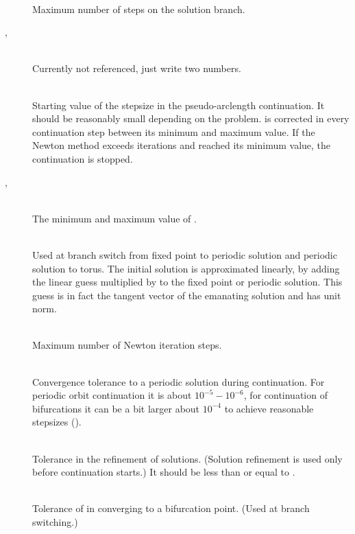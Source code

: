 \documentclass[10pt,a4paper]{ddedoc}
\begin{document}
\begin{description}
%
\item[] ~\\
Maximum number of steps on the solution branch.
%
\item[, ] ~\\
Currently not referenced, just write two numbers.
%
\item[] ~\\
Starting value of the stepsize in the pseudo-arclength continuation.
It should be reasonably small depending on the problem.  is corrected in every continuation step between its minimum and maximum value. If the Newton method exceeds  iterations and  reached its minimum value, the continuation is stopped.
%
\item[, ] ~\\
The minimum and maximum value of .
%
\item[] ~\\
Used at branch switch from fixed point to periodic solution and periodic solution to torus. The initial solution is approximated linearly, by adding the linear guess multiplied by  to the fixed point or periodic solution. This guess is in fact the tangent vector of the emanating solution and has unit norm.
%
\item[] ~\\
Maximum number of Newton iteration steps.
%
\item[] ~\\
Convergence tolerance to a periodic solution during continuation. For periodic orbit continuation it is about $10^{-5} - 10^{-6}$, for continuation of bifurcations it can be a bit larger about $10^{-4}$ to achieve reasonable stepsizes ().
%
\item[] ~\\
Tolerance in the refinement of solutions. (Solution refinement is used only before continuation starts.) It should be less than or equal to .
%
\item[] ~\\
Tolerance of  in converging to a bifurcation point. (Used at branch switching.)
\end{description}
\end{document}

